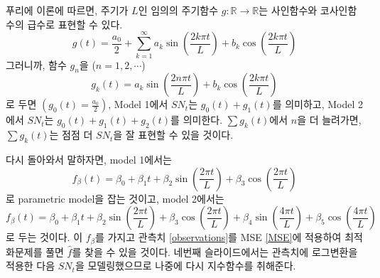 \documentclass{article}
\begin{document}
푸리에 이론에 따르면, 주기가 \(L\)인 임의의 주기함수 \(g:\mathbb R\to\mathbb R\)는 사인함수와 코사인함수의 급수로 표현할 수 있다.
\[g(t) = \frac{a_0}2+\sum_{k=1}^\infty a_k\sin\left(\frac{2k\pi t}L\right)+b_k\cos\left(\frac{2k\pi t}L\right)\]
그러니까, 함수 \(g_n\)을 (\(n=1,2,\cdots\))
\[g_k(t) = a_k\sin\left(\frac{2n\pi t}L\right)+b_k\cos\left(\frac{2k\pi t}L\right)\]
로 두면 \(\left(g_0(t)=\frac{a_0}2\right)\), Model 1에서 \(SN_t\)는 \(g_0(t)+g_1(t)\)를 의미하고, Model 2에서 \(SN_t\)는 \(g_0(t)+g_1(t)+g_2(t)\)를 의미한다.
\(\sum g_k(t)\)에서 \(n\)을 더 늘려가면, \(\sum g_k(t)\)는 점점 더 \(SN_t\)을 잘 표현할 수 있을 것이다.

다시 돌아와서 말하자면, model 1에서는
\[f_\beta(t)=\beta_0+\beta_1t+\beta_2\sin\left(\frac{2\pi t}L\right)+\beta_3\cos\left(\frac{2\pi t}L\right)\]
로 parametric model을 잡는 것이고, model 2에서는
\[f_\beta(t)=\beta_0+\beta_1t+\beta_2\sin\left(\frac{2\pi t}L\right)+\beta_3\cos\left(\frac{2\pi t}L\right)
+\beta_4\sin\left(\frac{4\pi t}L\right)+\beta_5\cos\left(\frac{4\pi t}L\right)\]
로 두는 것이다.
이 \(f_\beta\)를 가지고 관측치 \eqref{observations}를 MSE \eqref{MSE}에 적용하여 최적화문제를 풀면 \(\hat f\)를 찾을 수 있을 것이다.
네번째 슬라이드에서는 관측치에 로그변환을 적용한 다음 \(SN_t\)을 모델링했으므로 나중에 다시 지수함수를 취해준다.

\end{document}
